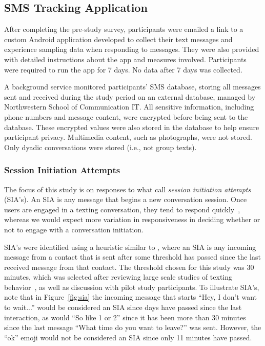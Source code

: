 \documentclass[12pt]{nuthesis}	%
\begin{document}
\subsection{SMS Tracking Application}

After completing the pre-study survey, participants were emailed a link to a custom Android application developed to collect their text messages and experience sampling data when responding to messages. They were also provided with detailed instructions about the app and measures involved. Participants were required to run the app for 7 days. No data after 7 days was collected.

A background service monitored participants' SMS database, storing all messages sent and received during the study period on an external database, managed by Northwestern School of Communication IT. All sensitive information, including phone numbers and message content, were encrypted before being sent to the database. These encrypted values were also stored in the database to help ensure participant privacy. Multimedia content, such as photographs, were not stored. Only dyadic conversations were stored (i.e., not group texts).

\subsubsection{Session Initiation Attempts}

The focus of this study is on responses to what \citet{avrahami2006responsiveness} call \textit{session initiation attempts} (SIA's). An SIA is any message that begins a new conversation session. Once users are engaged in a texting conversation, they tend to respond quickly~\citep{battestini2010large}, whereas we would expect more variation in responsiveness in deciding whether or not to engage with a conversation initiation.

SIA's were identified using a heuristic similar to \citet{avrahami2006responsiveness}, where an SIA is any incoming message from a contact that is sent after some threshold has passed since the last received message from that contact. The threshold chosen for this study was 30 minutes, which was selected after reviewing large scale studies of texting behavior~\citep{battestini2010large,birnholtz2017attending}, as well as discussion with pilot study participants. To illustrate SIA's, note that in Figure~\ref{fig:sia} the incoming message that starts ``Hey, I don't want to wait...'' would be considered an SIA since days have passed since the last interaction, as would ``So like 1 or 2'' since it has been more than 30 minutes since the last message ``What time do you want to leave?'' was sent. However, the ``ok'' emoji would not be considered an SIA since only 11 minutes have passed.
\end{document}
